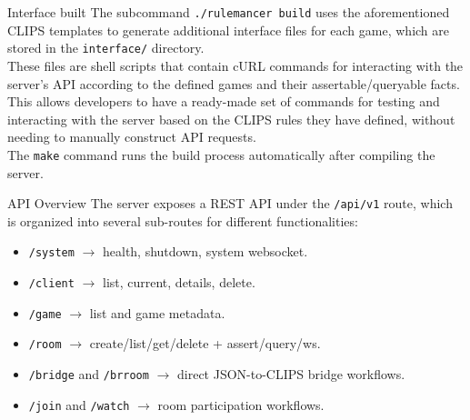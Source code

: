 \documentclass[aspectratio=169]{beamer}
\begin{document}
\begin{frame}{Interface built}
The subcommand \texttt{./rulemancer build} uses the aforementioned CLIPS templates to generate
additional interface files for each game, which are stored in the \texttt{interface/} directory. \\
\vspace{0.4cm}
These files are shell scripts that contain cURL commands for interacting with the server's API
according to the defined games and their assertable/queryable facts. \\
\vspace{0.4cm}
This allows developers to have a ready-made set of commands for testing and interacting with the server based
on the CLIPS rules they have defined, without needing to manually construct API requests. \\
\vspace{0.4cm}
The \texttt{make} command runs the build process automatically after compiling the server.
\end{frame}

\begin{frame}{API Overview}
The server exposes a REST API under the \texttt{/api/v1} route, which is organized into several sub-routes
for different functionalities:
\vspace{0.3cm}
\begin{itemize}
  \item \texttt{/system} $\rightarrow$ health, shutdown, system websocket.
  \vspace{0.3cm}
  \item \texttt{/client} $\rightarrow$ list, current, details, delete.
  \vspace{0.3cm}
  \item \texttt{/game} $\rightarrow$ list and game metadata.
  \vspace{0.3cm}
  \item \texttt{/room} $\rightarrow$ create/list/get/delete + assert/query/ws.
  \vspace{0.3cm}
  \item \texttt{/bridge} and \texttt{/brroom} $\rightarrow$ direct JSON-to-CLIPS bridge workflows.
  \vspace{0.3cm}
  \item \texttt{/join} and \texttt{/watch} $\rightarrow$ room participation workflows.
\end{itemize}
\end{frame}
\end{document}
